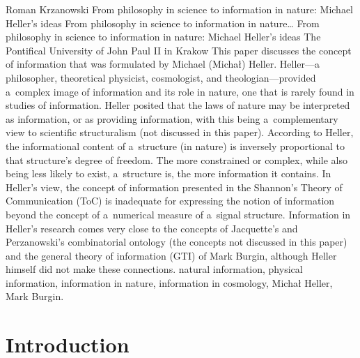 \begin{artengenv}{Roman Krzanowski}
	{From philosophy in science to information in nature: Michael Heller's ideas}
	{From philosophy in science to information in nature\ldots}
	{From philosophy in science to information in nature: Michael Heller's ideas}
	{The Pontifical University of John Paul II in Krakow}
	{This paper discusses the concept of information that was formulated by Michael (Michał) Heller. Heller---a philosopher, theoretical physicist, cosmologist, and theologian---provided a~complex image of information and its role in nature, one that is rarely found in studies of information. Heller posited that the laws of nature may be interpreted as information, or as providing information, with this being a~complementary view to scientific structuralism (not discussed in this paper). According to Heller, the informational content of a~structure (in nature) is inversely proportional to that structure's degree of freedom. The more constrained or complex, while also being less likely to exist, a~structure is, the more information it contains. In Heller's view, the concept of information presented in the Shannon's Theory of Communication (ToC) is inadequate for expressing the notion of information beyond the concept of a~numerical measure of a~signal structure. Information in Heller's research comes very close to the concepts of Jacquette's and Perzanowski's combinatorial ontology (the concepts not discussed in this paper) and the general theory of information (GTI) of Mark Burgin, although Heller himself did not make these connections.
	}
	{natural information, physical information, information in nature, information in cosmology, Michał Heller, Mark Burgin.}



\section{Introduction}


\end{artengenv}
